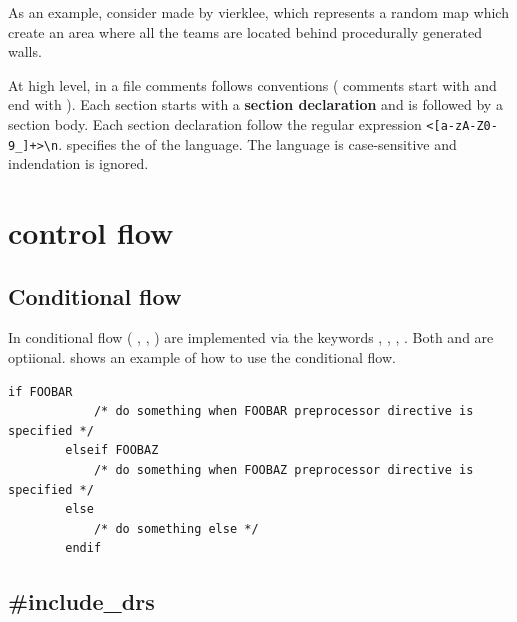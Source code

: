 \begin{appendices}
    As an example, consider  made by vierklee, which represents a random map which create an area where all the teams are located behind procedurally generated walls.

    

    At high level, in a  file comments follows  conventions (\ie{} comments start with \dquote{/* } and end with \dquote{ */}). Each section starts with a \textbf{section declaration} and is followed by a section body. Each section declaration follow the regular expression \verb|<[a-zA-Z0-9_]+>\n|.  specifies the  of the  language. The language is case-sensitive and indendation is ignored\cite{zetnus:2019}.

    

    \section{ control flow}

    \subsection{Conditional flow}

    In  conditional flow (\ie{} , , ) are implemented via the keywords , , , . Both  and  are optiional.
     shows an example of how to use the conditional flow.

    \begin{lstlisting}[language={rms}, label={lst:if}]
        if FOOBAR
            /* do something when FOOBAR preprocessor directive is specified */
        elseif FOOBAZ
            /* do something when FOOBAZ preprocessor directive is specified */
        else
            /* do something else */
        endif
    \end{lstlisting}

    \subsection{\#include\_drs}


\end{appendices}
